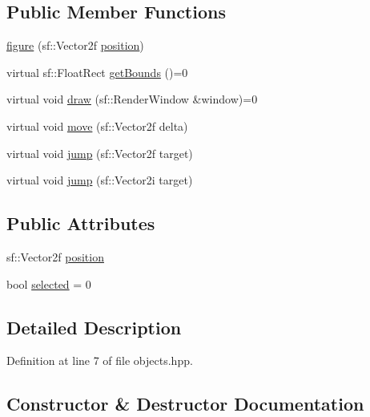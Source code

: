\subsection*{Public Member Functions}
\begin{DoxyCompactItemize}
\item 
\hyperlink{classfigure_a73a600829aee74a3ac635b4a7d0719b8}{figure} (sf\+::\+Vector2f \hyperlink{classfigure_a2196c51490b69027860fdb015913de19}{position})
\item 
virtual sf\+::\+Float\+Rect \hyperlink{classfigure_aca9a3924bc0883e1aa8e93c04887abbc}{get\+Bounds} ()=0
\item 
virtual void \hyperlink{classfigure_a56d8a53a8bf2b82178aa476bac071596}{draw} (sf\+::\+Render\+Window \&window)=0
\item 
virtual void \hyperlink{classfigure_ac7592a3b4cb4210fbd114c42d015c4e7}{move} (sf\+::\+Vector2f delta)
\item 
virtual void \hyperlink{classfigure_a2290acc133127e643fab20c7ce9ab975}{jump} (sf\+::\+Vector2f target)
\item 
virtual void \hyperlink{classfigure_a25bfb0a452b2b2fe60f7f01b08dab423}{jump} (sf\+::\+Vector2i target)
\end{DoxyCompactItemize}
\subsection*{Public Attributes}
\begin{DoxyCompactItemize}
\item 
sf\+::\+Vector2f \hyperlink{classfigure_a2196c51490b69027860fdb015913de19}{position}
\item 
bool \hyperlink{classfigure_aaaf0bac968262da5781ddcfbb6bcb687}{selected} = 0
\end{DoxyCompactItemize}


\subsection{Detailed Description}


Definition at line 7 of file objects.\+hpp.



\subsection{Constructor \& Destructor Documentation}
\mbox{\label{classfigure_a73a600829aee74a3ac635b4a7d0719b8}} 

